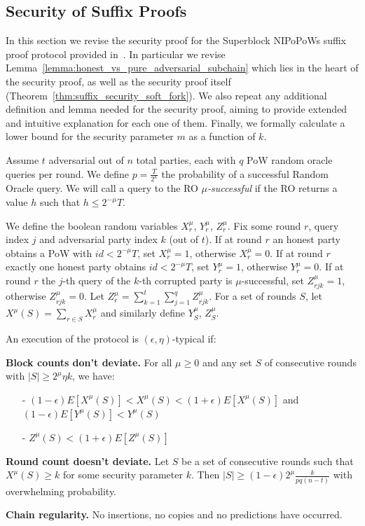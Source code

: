 \subsection{Security of Suffix Proofs} \label{proof_under_hard_fork}
In this section we revise the security proof for the Superblock NIPoPoWs suffix proof protocol provided in~\cite{nipopows}. In particular we revise Lemma~\ref{lemma:honest_vs_pure_adversarial_subchain} which lies in the heart of the security proof, as well as the security proof itself (Theorem~\ref{thm:suffix_security_soft_fork}). We also repeat any additional
definition and lemma needed for the security proof, aiming to provide extended and intuitive explanation for each one of them. Finally, we formally calculate a lower bound for the security parameter $m$ as a function of $k$.

Assume $t$ adversarial out of $n$ total parties, each with $q$ PoW random oracle
queries per round. We define $p = \frac{T}{2^\kappa}$ the probability of a
successful Random Oracle query. We will call a query to the RO $\mu$\textit{-successful}
if the RO returns a value $h$ such that $h \leq 2^{-\mu}T$.

We define the boolean random variables $X_r^{\mu}$, $Y_r^{\mu}$, $Z_r^{\mu}$.
Fix some round $r$, query index $j$ and adversarial party index $k$ (out of $t$).
If at round $r$ an honest party obtains a PoW with $id < 2^{-\mu}T$, set $X_r^{\mu} = 1$,
otherwise $X_r^{\mu} = 0$. If at round $r$ exactly one honest party obtains
$id < 2^{-\mu}T$, set $Y_r^{\mu} = 1$, otherwise $Y_r^{\mu} = 0$. If at round $
r$ the $j$-th query of the $k$-th corrupted party is $\mu$-successful, set
$Z_{rjk}^{\mu} = 1$, otherwise $Z_{rjk}^{\mu} = 0$. Let $Z_r^{\mu} =
\sum_{k=1}^t\sum_{j=1}^qZ_{rjk}^{\mu}$. For a set of rounds $S$, let
$X^\mu(S) = \sum_{r \in S}X^{\mu}_r$ and similarly define $Y_S^{\mu}$, $Z_S^{\mu}$.\\

\begin{defn}
	An execution of the protocol is $(\epsilon, \eta)$-typical if:
	
	\textbf{Block counts don't deviate.} For all $\mu \geq 0$ and any set
	$S$ of consecutive rounds with $\vert S \vert \geq 2^\mu \eta k$, we have:
	\begin{itemize}
		\item[-] $(1-\epsilon)E[X^\mu(S)] < X^\mu(S) < (1+\epsilon)E[X^\mu(S)] $ and
			$(1-\epsilon)E[Y^\mu(S)] < Y^\mu(S)$
		\item[-] $Z^\mu(S) < (1+\epsilon)E[Z^\mu(S)]$
\end{itemize}

	\textbf{Round count doesn't deviate.} Let $S$ be a set of consecutive rounds
	such that $X^\mu(S) \geq k$ for some security parameter $k$. Then $\vert S \vert
	\geq (1-\epsilon)2^\mu \frac{k}{pq(n-t)}$ with overwhelming probability.
	
	\textbf{Chain regularity.} No insertions, no copies and no predictions
	\cite{backbone} have occurred.
	\label{defn:typical_execution}
\end{defn}

